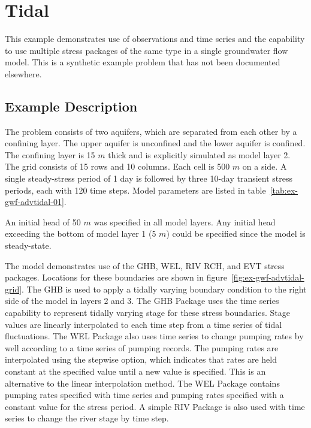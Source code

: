 \section{Tidal}

This example demonstrates use of \mf observations and time series and the capability to use multiple stress packages of the same type in a single groundwater flow model.  This is a synthetic example problem that has not been documented elsewhere.

\subsection{Example Description}

The problem consists of two aquifers, which are separated from each other by a confining layer. The upper aquifer is unconfined and the lower aquifer is confined.  The confining layer is 15 $m$ thick and is explicitly simulated as model layer 2. The grid consists of 15 rows and 10 columns.  Each cell is 500 $m$ on a side.  A single steady-stress period of 1 day is followed by three 10-day transient stress periods, each with 120 time steps.  Model parameters are listed in table~\ref{tab:ex-gwf-advtidal-01}. 



An initial head of 50 $m$ was specified in all model layers. Any initial head exceeding the bottom of model layer 1 (5 $m$) could be specified since the model is steady-state.

The model demonstrates use of the GHB, WEL, RIV RCH, and EVT stress packages. Locations for these boundaries are shown in figure~\ref{fig:ex-gwf-advtidal-grid}. The GHB is used to apply a tidally varying boundary condition to the right side of the model in layers 2 and 3.  The GHB Package uses the time series capability to represent  tidally varying stage for these stress boundaries.  Stage values are linearly interpolated to each time step from a time series of tidal fluctuations.  The WEL Package also uses time series to change pumping rates by well according to a time series of pumping records.  The pumping rates are interpolated using the stepwise option, which indicates that rates are held constant at the specified value until a new value is specified.  This is an alternative to the linear interpolation method.  The WEL Package contains pumping rates specified with time series and pumping rates specified with a constant value for the stress period.  A simple RIV Package is also used with time series to change the river stage by time step.  

